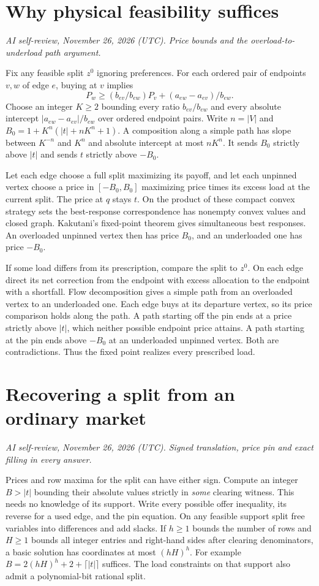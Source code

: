 \documentclass[11pt,oneside,openany,notitlepage]{report}
\newcommand{\reviewdate}{November 26, 2026 (UTC)}
\newcommand{\reviewmark}[1]{\par\nopagebreak[4]\noindent
  {\footnotesize\itshape AI self-review, \reviewdate. #1\par}\nobreak\smallskip}
\begin{document}
\section{Why physical feasibility suffices}
\reviewmark{Price bounds and the overload-to-underload path argument.}

Fix any feasible split \(z^0\) ignoring preferences. For each ordered pair
of endpoints \(v,w\) of edge \(e\), buying at \(v\) implies
\[
 P_w\ge (b_{ev}/b_{ew})P_v+(a_{ew}-a_{ev})/b_{ew}.
\]
Choose an integer \(K\ge2\) bounding every ratio \(b_{ev}/b_{ew}\) and
every absolute intercept \(|a_{ew}-a_{ev}|/b_{ew}\) over ordered
endpoint pairs.
Write \(n=|V|\) and \(B_0=1+K^n(|t|+nK^n+1)\).
A composition along a simple path has slope between \(K^{-n}\) and
\(K^n\) and absolute intercept at most \(nK^n\). It sends \(B_0\) strictly
above \(|t|\) and sends \(t\) strictly above \(-B_0\).

Let each edge choose a full split maximizing its payoff, and let each
unpinned vertex choose a price in \([-B_0,B_0]\) maximizing price times
its excess load at the current split. The price at \(q\) stays \(t\).
On the product of these compact convex strategy sets the best-response
correspondence has nonempty convex values and closed graph. Kakutani's
fixed-point theorem gives simultaneous best responses. An overloaded
unpinned vertex then has price \(B_0\), and an underloaded one has
price \(-B_0\).

If some load differs from its prescription, compare the split to \(z^0\).
On each edge direct its net correction from the endpoint with excess
allocation to the endpoint with a shortfall. Flow decomposition gives a
simple path from an overloaded vertex to an underloaded one. Each edge
buys at its departure vertex, so its price comparison holds along the
path. A path starting off the pin ends at a price strictly above \(|t|\),
which neither possible endpoint price attains. A path starting at the pin
ends above \(-B_0\) at an underloaded unpinned vertex. Both are
contradictions. Thus the fixed point realizes every prescribed load.

\section{Recovering a split from an ordinary market}
\reviewmark{Signed translation, price pin and exact filling in every answer.}

Prices and row maxima for the split can have either sign. Compute an
integer \(B>|t|\) bounding their absolute values strictly in \emph{some}
clearing witness. This needs no knowledge of its support. Write every
possible offer inequality, its reverse for a used edge, and the pin
equation. On any feasible support split free variables into differences
and add slacks. If \(h\ge1\) bounds the number of rows and \(H\ge1\)
bounds all integer entries and right-hand sides after clearing denominators,
a basic solution has coordinates at most \((hH)^h\).
For example \(B=2(hH)^h+2+\lceil|t|\rceil\) suffices. The load constraints
on that support also admit a polynomial-bit rational split.
\end{document}
